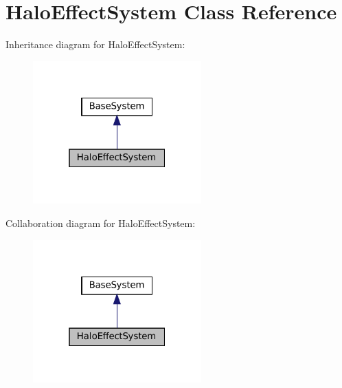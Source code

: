 \hypertarget{classHaloEffectSystem}{}\section{Halo\+Effect\+System Class Reference}
\label{classHaloEffectSystem}


Inheritance diagram for Halo\+Effect\+System\+:\nopagebreak
\begin{figure}[H]
\begin{center}
\leavevmode
\includegraphics[width=184pt]{classHaloEffectSystem__inherit__graph}
\end{center}
\end{figure}


Collaboration diagram for Halo\+Effect\+System\+:\nopagebreak
\begin{figure}[H]
\begin{center}
\leavevmode
\includegraphics[width=184pt]{classHaloEffectSystem__coll__graph}
\end{center}
\end{figure}
